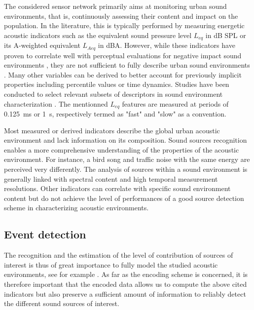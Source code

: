 \documentclass[sensors,article,submit,moreauthors,pdftex,10pt,a4paper]{mdpi}
\begin{document}
The considered sensor network primarily aims at monitoring urban sound environments, that is, continuously assessing their content and impact on the population. In the literature, this is typically performed by measuring energetic acoustic indicators such as the equivalent sound pressure level $L_{eq}$ in dB SPL or its A-weighted equivalent $L_{Aeq}$ in dBA. However, while these indicators have proven to correlate well with perceptual evaluations for negative impact sound environments \cite{gozalo2015}, they are not sufficient to fully describe urban sound environments \cite{rychtarikova2013}. Many other variables can be derived to better account for previously implicit properties \cite{can2016} including percentile values or time dynamics. Studies have been conducted to select relevant subsets of descriptors in sound environment characterization \cite{can2015, brocolini2013, nilsson2007}. The mentionned $L_{eq}$ features are measured at periods of 0.125~ms or 1~s, respectively termed as "fast" and "slow" as a convention.

Most measured or derived indicators describe the global urban acoustic environment and lack information on its composition. Sound sources recognition enables a more comprehensive understanding of the properties of the acoustic environment. For instance, a bird song and traffic noise with the same energy are perceived very differently. The analysis of sources within a sound environment is generally linked with spectral content \cite{ishiyama2000} and high temporal measurement resolutions. Other indicators can correlate with specific sound environment content \cite{aumond2017} but do not achieve the level of performances of a good source detection scheme in characterizing acoustic environments.



\subsection{Event detection}

The recognition and the estimation of the level of contribution of sources of interest is thus of great importance to fully model the studied acoustic environments, see for example \cite{alsina2016design, app7020146, gloaguen2016estimating}. As far as the encoding scheme is concerned, it is therefore important that the encoded data allows us to compute the above cited indicators but also preserve a sufficient amount of information to reliably detect the different sound sources of interest.
\end{document}
